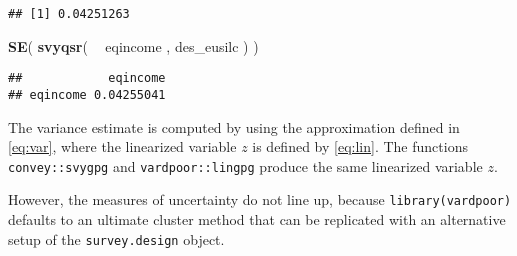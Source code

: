 \documentclass[]{book}
\newenvironment{Shaded}{\begin{snugshade}}{\end{snugshade}}
\newcommand{\KeywordTok}[1]{\textcolor[rgb]{0.13,0.29,0.53}{\textbf{#1}}}
\newcommand{\NormalTok}[1]{#1}
\newcommand{\OperatorTok}[1]{\textcolor[rgb]{0.81,0.36,0.00}{\textbf{#1}}}
\newcommand{\StringTok}[1]{\textcolor[rgb]{0.31,0.60,0.02}{#1}}
\begin{document}
\begin{verbatim}
## [1] 0.04251263
\end{verbatim}

\begin{Shaded}
\begin{Highlighting}[]
\KeywordTok{SE}\NormalTok{( }\KeywordTok{svyqsr}\NormalTok{( }\OperatorTok{~}\StringTok{ }\NormalTok{eqincome , des_eusilc ) )}
\end{Highlighting}
\end{Shaded}

\begin{verbatim}
##            eqincome
## eqincome 0.04255041
\end{verbatim}

The variance estimate is computed by using the approximation defined in \eqref{eq:var}, where the linearized variable \(z\) is defined by \eqref{eq:lin}. The functions \texttt{convey::svygpg} and \texttt{vardpoor::lingpg} produce the same linearized variable \(z\).

However, the measures of uncertainty do not line up, because \texttt{library(vardpoor)} defaults to an ultimate cluster method that can be replicated with an alternative setup of the \texttt{survey.design} object.
\end{document}
